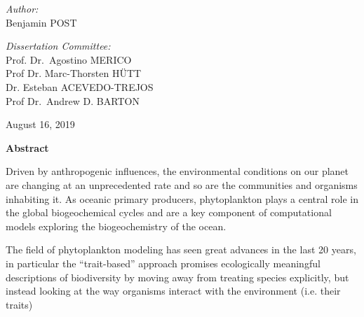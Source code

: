 \begin{titlepage}
\begin{center}
\vspace{3 cm}
\begin{minipage}{0.4\textwidth}
\begin{flushleft} 
\emph{Author:}\\
Benjamin \MakeUppercase{Post}
\end{flushleft}
\end{minipage}
\begin{minipage}{0.4\textwidth}
\begin{flushright} 
\emph{Dissertation Committee:} \\
Prof. Dr.~Agostino \MakeUppercase{Merico}\\
Prof Dr. Marc-Thorsten \MakeUppercase{Hütt}\\
Dr. Esteban \MakeUppercase{Acevedo-Trejos}\\
Prof Dr.~Andrew D. \MakeUppercase{Barton}\\
\end{flushright}
\end{minipage}

\vspace{2cm}

{August 16, 2019 }

\end{center}


\large 
\textbf{Abstract} \\

\normalsize



Driven by anthropogenic influences, the environmental conditions on our planet are changing at an unprecedented rate and so are the communities and organisms inhabiting it. As oceanic primary producers, phytoplankton plays a central role in the global biogeochemical cycles and are a key component of computational models exploring the biogeochemistry of the ocean. 

The field of phytoplankton modeling has seen great advances in the last 20 years, in particular the “trait-based” approach 
promises  %
ecologically meaningful descriptions of biodiversity by moving away from treating species explicitly, but instead looking at the way organisms interact with the environment 
(i.e. their traits) %


\end{titlepage}
